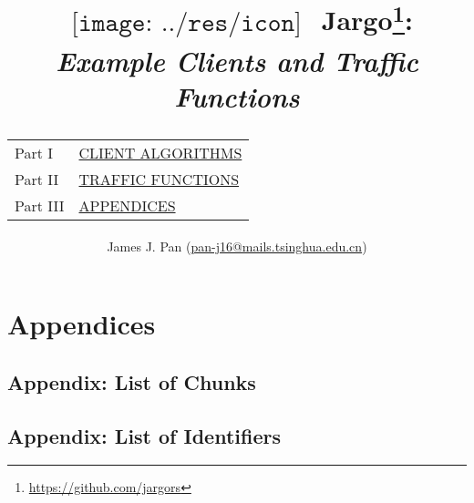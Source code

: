 \documentclass{report}
\title{
  $
  \begin{array}{l}
  \texttt{[image: ../res/icon]}
  \end{array}
  $
  Jargo\footnote{\url{https://github.com/jargors}}:\\
  \large{\textbf{\textit{Example Clients and Traffic Functions}}}\\
  \vspace{2em}
  {
    \small
    \begin{tabular}{lp{.6\textwidth}}
    \toprule
    Part I  &\hyperref[part-client]{\textsc{CLIENT ALGORITHMS}}\\
    Part II &\hyperref[part-traffic]{\textsc{TRAFFIC FUNCTIONS}}\\
    Part III  &\hyperref[part-appendices]{\textsc{APPENDICES}}\\
    \bottomrule
    \end{tabular}
  }
}
\author{
  \small{James J. Pan (\href{mailto:pan-j16@mails.tsinghua.edu.cn}{pan-j16@mails.tsinghua.edu.cn})}
}
\begin{document}
\maketitle
\pagestyle{noweb}

\renewcommand{\thepage}{\roman{page}}
\setcounter{page}{1}

\tableofcontents



\part{Appendices}
\label{part-appendices}

\appendix

\chapter{Appendix: List of Chunks}
\nowebchunks

\chapter{Appendix: List of Identifiers}
\nowebindex
\end{document}
